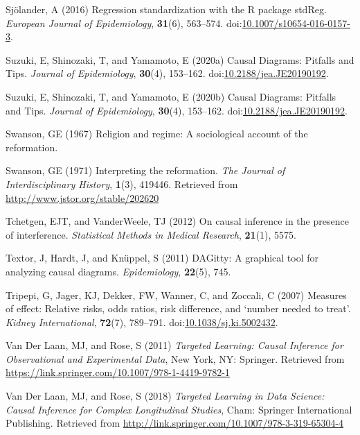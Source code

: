\documentclass[
  singlecolumn,
  9pt]{article}
\begin{document}
\begin{CSLReferences}
Sjölander, A (2016) Regression standardization with the R package
stdReg. \emph{European Journal of Epidemiology}, \textbf{31}(6),
563--574.
doi:\href{https://doi.org/10.1007/s10654-016-0157-3}{10.1007/s10654-016-0157-3}.

Suzuki, E, Shinozaki, T, and Yamamoto, E (2020a) Causal Diagrams:
Pitfalls and Tips. \emph{Journal of Epidemiology}, \textbf{30}(4),
153--162.
doi:\href{https://doi.org/10.2188/jea.JE20190192}{10.2188/jea.JE20190192}.

Suzuki, E, Shinozaki, T, and Yamamoto, E (2020b) Causal Diagrams:
Pitfalls and Tips. \emph{Journal of Epidemiology}, \textbf{30}(4),
153--162.
doi:\href{https://doi.org/10.2188/jea.JE20190192}{10.2188/jea.JE20190192}.

Swanson, GE (1967) Religion and regime: A sociological account of the
reformation.

Swanson, GE (1971) Interpreting the reformation. \emph{The Journal of
Interdisciplinary History}, \textbf{1}(3), 419446. Retrieved from
\url{http://www.jstor.org/stable/202620}

Tchetgen, EJT, and VanderWeele, TJ (2012) On causal inference in the
presence of interference. \emph{Statistical Methods in Medical
Research}, \textbf{21}(1), 5575.

Textor, J, Hardt, J, and Knüppel, S (2011) DAGitty: A graphical tool for
analyzing causal diagrams. \emph{Epidemiology}, \textbf{22}(5), 745.

Tripepi, G, Jager, KJ, Dekker, FW, Wanner, C, and Zoccali, C (2007)
Measures of effect: Relative risks, odds ratios, risk difference, and
{`}number needed to treat{'}. \emph{Kidney International},
\textbf{72}(7), 789--791.
doi:\href{https://doi.org/10.1038/sj.ki.5002432}{10.1038/sj.ki.5002432}.

Van Der Laan, MJ, and Rose, S (2011) \emph{Targeted Learning: Causal
Inference for Observational and Experimental Data}, New York, NY:
Springer. Retrieved from
\url{https://link.springer.com/10.1007/978-1-4419-9782-1}

Van Der Laan, MJ, and Rose, S (2018) \emph{Targeted Learning in Data
Science: Causal Inference for Complex Longitudinal Studies}, Cham:
Springer International Publishing. Retrieved from
\url{http://link.springer.com/10.1007/978-3-319-65304-4}


\end{CSLReferences}
\end{document}

